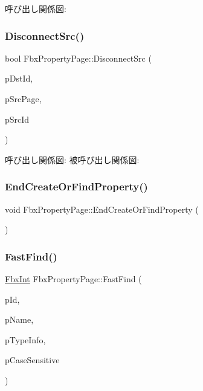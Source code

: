 呼び出し関係図\+:
\mbox{\label{class_fbx_property_page_a6055899e9dc5c8ef90364aef784bc7e2}} 
\subsubsection{\texorpdfstring{Disconnect\+Src()}{DisconnectSrc()}}
{\footnotesize\ttfamily bool Fbx\+Property\+Page\+::\+Disconnect\+Src (\begin{DoxyParamCaption}\item[{\hyperlink{fbxtypes_8h_a088fa96de3b0b3ea69f0f6afef525dfb}{Fbx\+Int}}]{p\+Dst\+Id,  }\item[{\hyperlink{class_fbx_property_page}{Fbx\+Property\+Page} $\ast$}]{p\+Src\+Page,  }\item[{\hyperlink{fbxtypes_8h_a088fa96de3b0b3ea69f0f6afef525dfb}{Fbx\+Int}}]{p\+Src\+Id }\end{DoxyParamCaption})}

呼び出し関係図\+:
被呼び出し関係図\+:
\mbox{\label{class_fbx_property_page_a955e3d64e6ee00c7d82133aff0c5c0cb}} 
\subsubsection{\texorpdfstring{End\+Create\+Or\+Find\+Property()}{EndCreateOrFindProperty()}}
{\footnotesize\ttfamily void Fbx\+Property\+Page\+::\+End\+Create\+Or\+Find\+Property (\begin{DoxyParamCaption}{ }\end{DoxyParamCaption})}

\mbox{\label{class_fbx_property_page_a613c04018ba60d91fa1a987070035491}} 
\subsubsection{\texorpdfstring{Fast\+Find()}{FastFind()}}
{\footnotesize\ttfamily \hyperlink{fbxtypes_8h_a088fa96de3b0b3ea69f0f6afef525dfb}{Fbx\+Int} Fbx\+Property\+Page\+::\+Fast\+Find (\begin{DoxyParamCaption}\item[{\hyperlink{fbxtypes_8h_a088fa96de3b0b3ea69f0f6afef525dfb}{Fbx\+Int}}]{p\+Id,  }\item[{const char $\ast$}]{p\+Name,  }\item[{\hyperlink{class_fbx_property_page}{Fbx\+Property\+Page} $\ast$}]{p\+Type\+Info,  }\item[{bool}]{p\+Case\+Sensitive }\end{DoxyParamCaption})}

